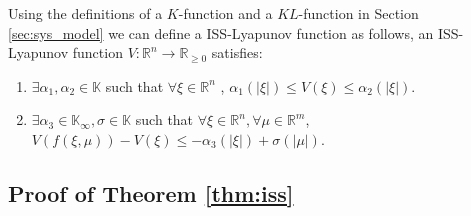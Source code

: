 \documentclass{sig-alternate}
\begin{document}
Using the definitions of a $ K $-function and a $ KL $-function in Section \ref{sec:sys_model}
we can define a ISS-Lyapunov function as follows,
an ISS-Lyapunov function $ V : \mathbb{R}^{n} \rightarrow \mathbb{R}_{\geq 0} $ satisfies:
\begin{enumerate}
\item $ \exists \alpha_{1}, \alpha_{2} \in \mathbb{K} $ such that 
$ \forall \xi \in \mathbb{R}^{n} $ , $ \alpha_{1} ( | \xi | ) \leq V( \xi ) \leq \alpha_{2}  ( | \xi | ) $.
\item $ \exists \alpha_{3} \in \mathbb{K}_{\infty} , \sigma \in \mathbb{K} $ such that $ \forall \xi \in \mathbb{R}^{n}, \forall \mu \in \mathbb{R}^{m} $,$  V( f( \xi, \mu ) ) - V( \xi ) \leq - \alpha_{3} ( | \xi | ) + \sigma ( | \mu | ) $. 
\end{enumerate}

\subsection{Proof of Theorem \ref{thm:iss}}
\label{sec:thm:iss:proof}
		
\end{document}
